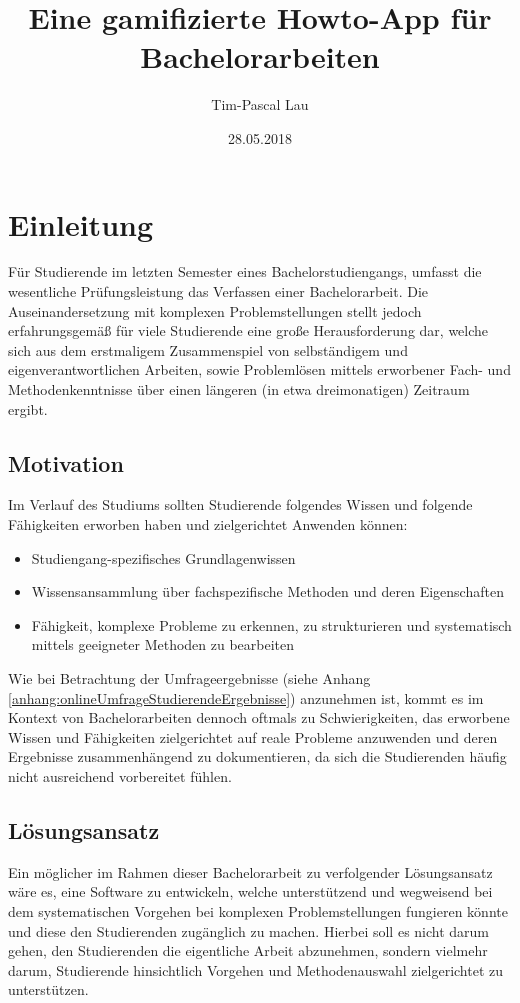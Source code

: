 \documentclass[bibliography=totoc,listof=totoc,BCOR=5mm,DIV=12,oneside]{scrbook}
\title{Eine gamifizierte Howto-App für Bachelorarbeiten}
\author{Tim-Pascal Lau}
\date{28.05.2018}
\begin{document}
\maketitle
\tableofcontents
\listoftables
\listoffigures
\lstlistoflistings

\chapter{Einleitung}
Für Studierende im letzten Semester eines Bachelorstudiengangs, umfasst die wesentliche Prüfungsleistung das Verfassen einer Bachelorarbeit.
Die Auseinandersetzung mit komplexen Problemstellungen stellt jedoch erfahrungsgemäß für viele Studierende eine große Herausforderung dar, welche sich aus dem erstmaligem Zusammenspiel von selbständigem und eigenverantwortlichen Arbeiten, sowie Problemlösen mittels erworbener Fach- und Methodenkenntnisse über einen längeren (in etwa dreimonatigen) Zeitraum ergibt.

\section{Motivation}
Im Verlauf des Studiums sollten Studierende folgendes Wissen und folgende Fähigkeiten erworben haben und zielgerichtet Anwenden können:
\begin{itemize}
\item Studiengang-spezifisches Grundlagenwissen
\item Wissensansammlung über fachspezifische Methoden und deren Eigenschaften
\item Fähigkeit, komplexe Probleme zu erkennen, zu strukturieren und systematisch mittels geeigneter Methoden zu bearbeiten
\end{itemize}
Wie bei Betrachtung der Umfrageergebnisse (siehe Anhang \ref{anhang:onlineUmfrageStudierendeErgebnisse}) anzunehmen ist, kommt es im Kontext von Bachelorarbeiten dennoch oftmals zu Schwierigkeiten, das erworbene Wissen und Fähigkeiten zielgerichtet auf reale Probleme anzuwenden und deren Ergebnisse zusammenhängend zu dokumentieren, da sich die Studierenden häufig nicht ausreichend vorbereitet fühlen.

\section{Lösungsansatz}
Ein möglicher im Rahmen dieser Bachelorarbeit zu verfolgender Lösungsansatz wäre es, eine Software zu entwickeln, welche unterstützend und wegweisend bei dem systematischen Vorgehen bei komplexen Problemstellungen fungieren könnte und diese den Studierenden zugänglich zu machen.
Hierbei soll es nicht darum gehen, den Studierenden die eigentliche Arbeit abzunehmen, sondern vielmehr darum, Studierende hinsichtlich Vorgehen und Methodenauswahl zielgerichtet zu unterstützen.
\end{document}
